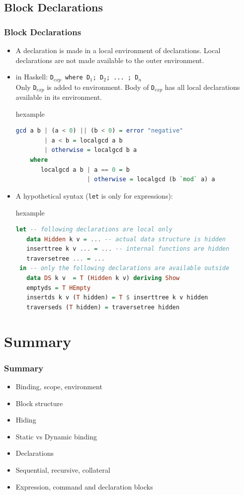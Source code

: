 \subsection{Block Declarations}
\begin{frame}[fragile]
\frametitle{Block Declarations}
{\small
\begin{itemize}
 \item A declaration is made in a local environment of declarations. Local declarations
 	are not made available to the outer environment.
 \item in Haskell: \texttt{D$_{exp}$ where D$_1$; D$_2$;  ... ; D$_n$}\\
 	Only \texttt{D$_{exp}$} is added to environment. Body of \texttt{D$_{exp}$} has all local
	declarations available in its environment.
\begin{beamercolorbox}{hexample}
\begin{lstlisting}[language={Haskell},escapechar=\#,basicstyle=\tiny\ttfamily]
gcd a b | (a < 0) || (b < 0) = error "negative"
        | a < b = localgcd a b
        | otherwise = localgcd b a  
    where 
       localgcd a b | a == 0 = b
                    | otherwise = localgcd (b `mod` a) a
\end{lstlisting}
\end{beamercolorbox}
\item A hypothetical syntax (\lstinline{let} is only for expressions):
\begin{beamercolorbox}{hexample}
\begin{lstlisting}[language={Haskell},escapechar=\#,basicstyle=\tiny\ttfamily]
let -- following declarations are local only
   data Hidden k v = ... -- actual data structure is hidden
   inserttree k v ... = ... -- internal functions are hidden
   traversetree ... = ...
 in -- only the following declarations are available outside
   data DS k v  = T (Hidden k v) deriving Show
   emptyds = T HEmpty
   insertds k v (T hidden) = T $ inserttree k v hidden
   traverseds (T hidden) = traversetree hidden
\end{lstlisting}
\end{beamercolorbox}
\end{itemize}
}
\end{frame}

\section{Summary}
\begin{frame}
\frametitle{Summary}
\begin{itemize}
\item Binding, scope, environment
\item Block structure
\item Hiding
\item Static vs Dynamic binding
\item Declarations
\item Sequential, recursive, collateral
\item Expression, command and declaration blocks
\end{itemize}
\end{frame}

